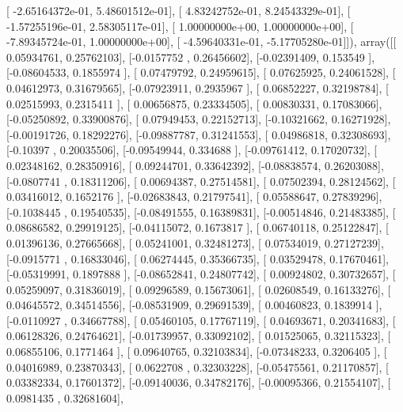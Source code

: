 \documentclass{article}
\begin{document}
       [ -2.65164372e-01,   5.48601512e-01],
       [  4.83242752e-01,   8.24543329e-01],
       [ -1.57255196e-01,   2.58305117e-01],
       [  1.00000000e+00,   1.00000000e+00],
       [ -7.89345724e-01,   1.00000000e+00],
       [ -4.59640331e-01,  -5.17705280e-01]]), array([[ 0.05934761,  0.25762103],
       [-0.0157752 ,  0.26456602],
       [-0.02391409,  0.153549  ],
       [-0.08604533,  0.1855974 ],
       [ 0.07479792,  0.24959615],
       [ 0.07625925,  0.24061528],
       [ 0.04612973,  0.31679565],
       [-0.07923911,  0.2935967 ],
       [ 0.06852227,  0.32198784],
       [ 0.02515993,  0.2315411 ],
       [ 0.00656875,  0.23334505],
       [ 0.00830331,  0.17083066],
       [-0.05250892,  0.33900876],
       [ 0.07949453,  0.22152713],
       [-0.10321662,  0.16271928],
       [-0.00191726,  0.18292276],
       [-0.09887787,  0.31241553],
       [ 0.04986818,  0.32308693],
       [-0.10397   ,  0.20035506],
       [-0.09549944,  0.334688  ],
       [-0.09761412,  0.17020732],
       [ 0.02348162,  0.28350916],
       [ 0.09244701,  0.33642392],
       [-0.08838574,  0.26203088],
       [-0.0807741 ,  0.18311206],
       [ 0.00694387,  0.27514581],
       [ 0.07502394,  0.28124562],
       [ 0.03416012,  0.1652176 ],
       [-0.02683843,  0.21797541],
       [ 0.05588647,  0.27839296],
       [-0.1038445 ,  0.19540535],
       [-0.08491555,  0.16389831],
       [-0.00514846,  0.21483385],
       [ 0.08686582,  0.29919125],
       [-0.04115072,  0.1673817 ],
       [ 0.06740118,  0.25122847],
       [ 0.01396136,  0.27665668],
       [ 0.05241001,  0.32481273],
       [ 0.07534019,  0.27127239],
       [-0.0915771 ,  0.16833046],
       [ 0.06274445,  0.35366735],
       [ 0.03529478,  0.17670461],
       [-0.05319991,  0.1897888 ],
       [-0.08652841,  0.24807742],
       [ 0.00924802,  0.30732657],
       [ 0.05259097,  0.31836019],
       [ 0.09296589,  0.15673061],
       [ 0.02608549,  0.16133276],
       [ 0.04645572,  0.34514556],
       [-0.08531909,  0.29691539],
       [ 0.00460823,  0.1839914 ],
       [-0.0110927 ,  0.34667788],
       [ 0.05460105,  0.17767119],
       [ 0.04693671,  0.20341683],
       [ 0.06128326,  0.24764621],
       [-0.01739957,  0.33092102],
       [ 0.01525065,  0.32115323],
       [ 0.06855106,  0.1771464 ],
       [ 0.09640765,  0.32103834],
       [-0.07348233,  0.3206405 ],
       [ 0.04016989,  0.23870343],
       [ 0.0622708 ,  0.32303228],
       [-0.05475561,  0.21170857],
       [ 0.03382334,  0.17601372],
       [-0.09140036,  0.34782176],
       [-0.00095366,  0.21554107],
       [ 0.0981435 ,  0.32681604],
\end{document}
